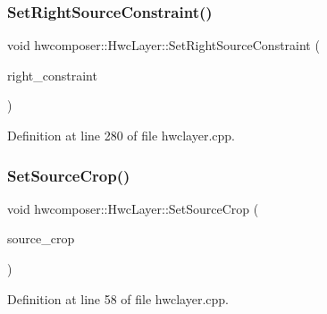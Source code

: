 \subsubsection{\texorpdfstring{Set\+Right\+Source\+Constraint()}{SetRightSourceConstraint()}}
{\footnotesize\ttfamily void hwcomposer\+::\+Hwc\+Layer\+::\+Set\+Right\+Source\+Constraint (\begin{DoxyParamCaption}\item[{int32\+\_\+t}]{right\+\_\+constraint }\end{DoxyParamCaption})}



Definition at line 280 of file hwclayer.\+cpp.


\begin{DoxyCode}{0}
\end{DoxyCode}
\mbox{\label{structhwcomposer_1_1HwcLayer_a83bafbef5b9c98ad5821acdeddd9a26e}} 
\subsubsection{\texorpdfstring{Set\+Source\+Crop()}{SetSourceCrop()}}
{\footnotesize\ttfamily void hwcomposer\+::\+Hwc\+Layer\+::\+Set\+Source\+Crop (\begin{DoxyParamCaption}\item[{const Hwc\+Rect$<$ float $>$ \&}]{source\+\_\+crop }\end{DoxyParamCaption})}



Definition at line 58 of file hwclayer.\+cpp.


